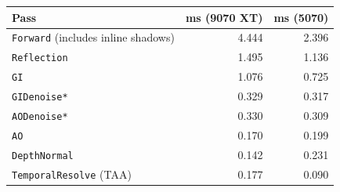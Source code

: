 \begin{tabular}{lrr}
\toprule
Pass & ms (9070 XT) & ms (5070) \\
\midrule
\texttt{Forward} (includes inline shadows) & 4.444 & 2.396 \\
\texttt{Reflection} & 1.495 & 1.136 \\
\texttt{GI} & 1.076 & 0.725 \\
\texttt{GIDenoise*} & 0.329 & 0.317 \\
\texttt{AODenoise*} & 0.330 & 0.309 \\
\texttt{AO} & 0.170 & 0.199 \\
\texttt{DepthNormal} & 0.142 & 0.231 \\
\texttt{TemporalResolve} (TAA) & 0.177 & 0.090 \\
\bottomrule
\end{tabular}
